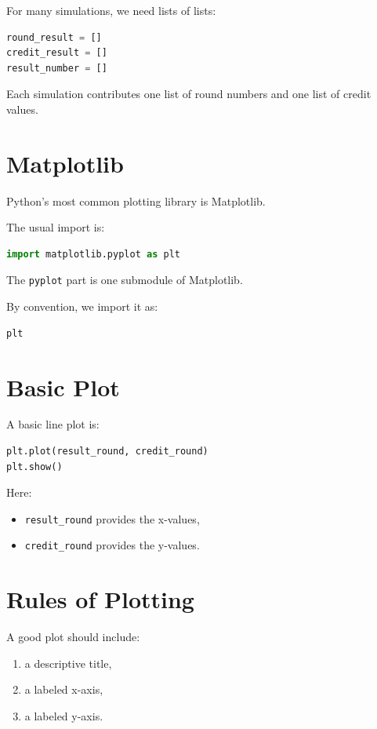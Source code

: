 \documentclass[11pt]{article}
\begin{document}
For many simulations, we need lists of lists:

\begin{lstlisting}[language=Python]
round_result = []
credit_result = []
result_number = []
\end{lstlisting}

Each simulation contributes one list of round numbers and one list of credit values.

\section{Matplotlib}

Python's most common plotting library is Matplotlib.

The usual import is:

\begin{lstlisting}[language=Python]
import matplotlib.pyplot as plt
\end{lstlisting}

The \texttt{pyplot} part is one submodule of Matplotlib.

By convention, we import it as:

\begin{lstlisting}[language=Python]
plt
\end{lstlisting}

\section{Basic Plot}

A basic line plot is:

\begin{lstlisting}[language=Python]
plt.plot(result_round, credit_round)
plt.show()
\end{lstlisting}

Here:

\begin{itemize}
    \item \verb|result_round| provides the x-values,
    \item \verb|credit_round| provides the y-values.
\end{itemize}

\section{Rules of Plotting}

A good plot should include:

\begin{enumerate}
    \item a descriptive title,
    \item a labeled x-axis,
    \item a labeled y-axis.
\end{enumerate}
\end{document}
